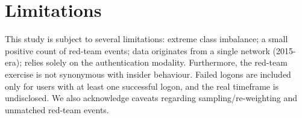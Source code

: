 \section{Limitations}
This study is subject to several limitations: extreme class imbalance; a small positive count of red-team events; data originates from a single network (2015-era); relies solely on the authentication modality. Furthermore, the red-team exercise is not synonymous with insider behaviour. Failed logons are included only for users with at least one successful logon, and the real timeframe is undisclosed. We also acknowledge caveats regarding sampling/re-weighting and unmatched red-team events.
